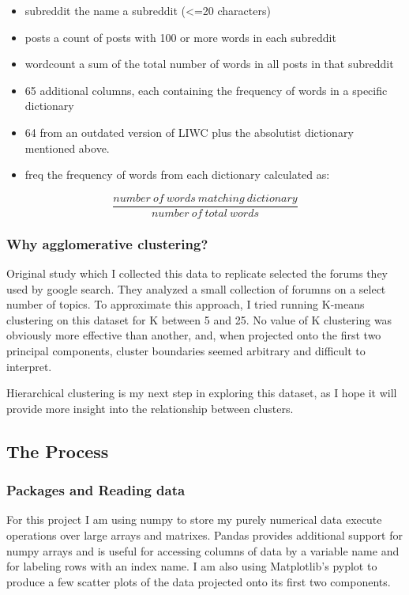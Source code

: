 \documentclass[11pt]{article}
\begin{document}
\begin{itemize}
\item
  subreddit the name a subreddit (\textless{}=20 characters)
\item
  posts a count of posts with 100 or more words in each subreddit
\item
  wordcount a sum of the total number of words in all posts in that
  subreddit
\item
  65 additional columns, each containing the frequency of words in a
  specific dictionary
\item
  64 from an outdated version of LIWC plus the absolutist dictionary
  mentioned above.
\item
  freq the frequency of words from each dictionary calculated as:
\end{itemize}

\[\frac{number\ of\ words\ matching\ dictionary}{number\ of\ total\ words}\]

\subsubsection{Why agglomerative
clustering?}\label{why-agglomerative-clustering}

Original study which I collected this data to replicate selected the
forums they used by google search. They analyzed a small collection of
forumns on a select number of topics. To approximate this approach, I
tried running K-means clustering on this dataset for K between 5 and 25.
No value of K clustering was obviously more effective than another, and,
when projected onto the first two principal components, cluster
boundaries seemed arbitrary and difficult to interpret.

Hierarchical clustering is my next step in exploring this dataset, as I
hope it will provide more insight into the relationship between
clusters.

\subsection{The Process}\label{the-process}

\subsubsection{Packages and Reading
data}\label{packages-and-reading-data}

For this project I am using numpy to store my purely numerical data
execute operations over large arrays and matrixes. Pandas provides
additional support for numpy arrays and is useful for accessing columns
of data by a variable name and for labeling rows with an index name. I
am also using Matplotlib's pyplot to produce a few scatter plots of the
data projected onto its first two components.
\end{document}
